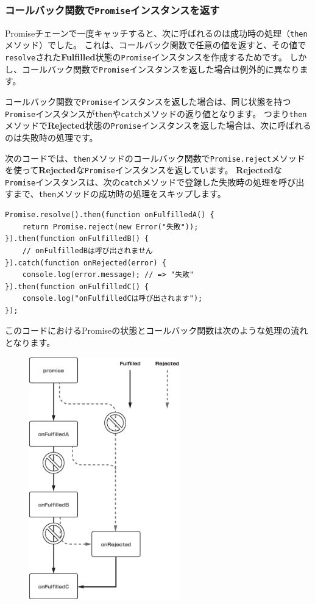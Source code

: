 \hypertarget{promise-then-return-promise}{%
\subsubsection{\texorpdfstring{コールバック関数で\texttt{Promise}インスタンスを返す}{コールバック関数でPromiseインスタンスを返す}}\label{promise-then-return-promise}}

Promiseチェーンで一度キャッチすると、次に呼ばれるのは成功時の処理（\texttt{then}メソッド）でした。
これは、コールバック関数で任意の値を返すと、その値で\texttt{resolve}された\textbf{Fulfilled}状態の\texttt{Promise}インスタンスを作成するためです。
しかし、コールバック関数で\texttt{Promise}インスタンスを返した場合は例外的に異なります。

コールバック関数で\texttt{Promise}インスタンスを返した場合は、同じ状態を持つ\texttt{Promise}インスタンスが\texttt{then}や\texttt{catch}メソッドの返り値となります。
つまり\texttt{then}メソッドで\textbf{Rejected}状態の\texttt{Promise}インスタンスを返した場合は、次に呼ばれるのは失敗時の処理です。

次のコードでは、\texttt{then}メソッドのコールバック関数で\texttt{Promise.reject}メソッドを使って\textbf{Rejected}な\texttt{Promise}インスタンスを返しています。
\textbf{Rejected}な\texttt{Promise}インスタンスは、次の\texttt{catch}メソッドで登録した失敗時の処理を呼び出すまで、\texttt{then}メソッドの成功時の処理をスキップします。

\begin{lstlisting}
Promise.resolve().then(function onFulfilledA() {
    return Promise.reject(new Error("失敗"));
}).then(function onFulfilledB() {
    // onFulfilledBは呼び出されません
}).catch(function onRejected(error) {
    console.log(error.message); // => "失敗"
}).then(function onFulfilledC() {
    console.log("onFulfilledCは呼び出されます");
});
\end{lstlisting}

このコードにおけるPromiseの状態とコールバック関数は次のような処理の流れとなります。

\begin{figure}[h]
\centering
\includegraphics[width=65mm]{./fig/then-rejected-promise.eps}
\end{figure}

